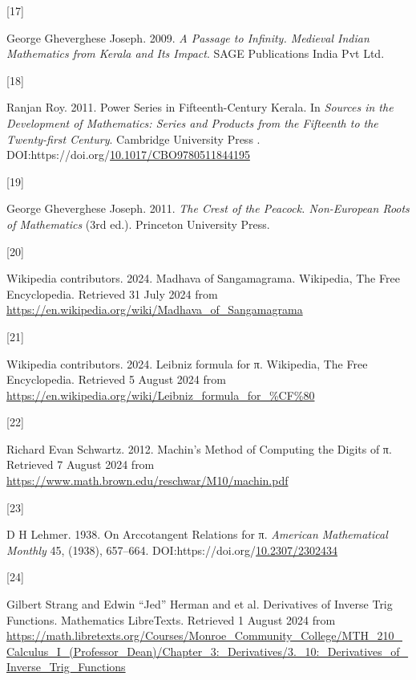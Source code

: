 \documentclass[
  a4paper,
]{article}
\newlength{\cslhangindent}
\newlength{\csllabelwidth}
\newenvironment{CSLReferences}[2] %
 {\begin{list}{}{%
  \setlength{\itemindent}{0pt}
  \setlength{\leftmargin}{0pt}
  \setlength{\parsep}{0pt}
  \ifodd #1
   \setlength{\leftmargin}{\cslhangindent}
   \setlength{\itemindent}{-1\cslhangindent}
  \fi
  \setlength{\itemsep}{#2\baselineskip}}}
 {\end{list}}
\newcommand{\CSLLeftMargin}[1]{\parbox[t]{\csllabelwidth}{\strut#1\strut}}
\newcommand{\CSLRightInline}[1]{\parbox[t]{\linewidth - \csllabelwidth}{\strut#1\strut}}
\begin{document}
\begin{CSLReferences}{0}{0}
\CSLLeftMargin{{[}17{]} }%
\CSLRightInline{George Gheverghese Joseph. 2009. \emph{{A Passage to
Infinity}. {Medieval Indian Mathematics from Kerala and Its Impact}}.
{SAGE Publications India Pvt Ltd}.}

\CSLLeftMargin{{[}18{]} }%
\CSLRightInline{Ranjan Roy. 2011. {Power Series in Fifteenth-Century
Kerala}. In \emph{{Sources in the Development of Mathematics}: {Series
and Products from the Fifteenth to the Twenty-first Century}}.
{Cambridge University Press }.
DOI:https://doi.org/\href{https://doi.org/10.1017/CBO9780511844195}{10.1017/CBO9780511844195}}

\CSLLeftMargin{{[}19{]} }%
\CSLRightInline{George Gheverghese Joseph. 2011. \emph{{The Crest of the
Peacock}. {Non-European Roots of Mathematics}} (3rd ed.). Princeton
University Press.}

\CSLLeftMargin{{[}20{]} }%
\CSLRightInline{Wikipedia contributors. 2024. {Madhava of Sangamagrama}.
{Wikipedia, The Free Encyclopedia}. Retrieved 31 July 2024 from
\url{https://en.wikipedia.org/wiki/Madhava_of_Sangamagrama}}

\CSLLeftMargin{{[}21{]} }%
\CSLRightInline{Wikipedia contributors. 2024. {Leibniz formula for π}.
{Wikipedia, The Free Encyclopedia}. Retrieved 5 August 2024 from
\url{https://en.wikipedia.org/wiki/Leibniz_formula_for_\%CF\%80}}

\CSLLeftMargin{{[}22{]} }%
\CSLRightInline{Richard Evan Schwartz. 2012. {Machin's Method of
Computing the Digits of π}. Retrieved 7 August 2024 from
\url{https://www.math.brown.edu/reschwar/M10/machin.pdf}}

\CSLLeftMargin{{[}23{]} }%
\CSLRightInline{D H Lehmer. 1938. {On Arccotangent Relations for π}.
\emph{American Mathematical Monthly} 45, (1938), 657--664.
DOI:https://doi.org/\href{https://doi.org/10.2307/2302434}{10.2307/2302434}}

\CSLLeftMargin{{[}24{]} }%
\CSLRightInline{Gilbert Strang and Edwin ``Jed'' Herman and et al.
{Derivatives of Inverse Trig Functions}. Mathematics LibreTexts.
Retrieved 1 August 2024 from
\url{https://math.libretexts.org/Courses/Monroe_Community_College/MTH_210_Calculus_I_(Professor_Dean)/Chapter_3:_Derivatives/3._10:_Derivatives_of_Inverse_Trig_Functions}}


\end{CSLReferences}
\end{document}

